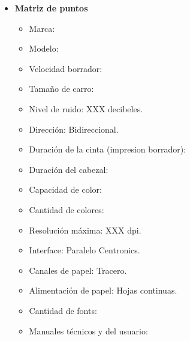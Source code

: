 \begin{enumerate}
\begin{itemize}
    \item \textbf{Matriz de puntos}
    \begin{itemize}
      \item Marca:
      \item Modelo:
      \item Velocidad borrador:
      \item Tamaño de carro:
      \item Nivel de ruido: XXX decibeles.
      \item Dirección: Bidireccional.
      \item Duración de la cinta (impresion borrador):
      \item Duración del cabezal:
      
      \item Capacidad de color:
      \item Cantidad de colores:
      \item Resolución máxima: XXX dpi.
      
      \item Interface: Paralelo Centronics.
      
      \item Canales de papel: Tracero.
      \item Alimentación de papel: Hojas continuas.
      
      \item Cantidad de fonts:
      
      \item Manuales técnicos y del usuario:
    \end{itemize}
    
  \end{itemize}
\end{enumerate} 